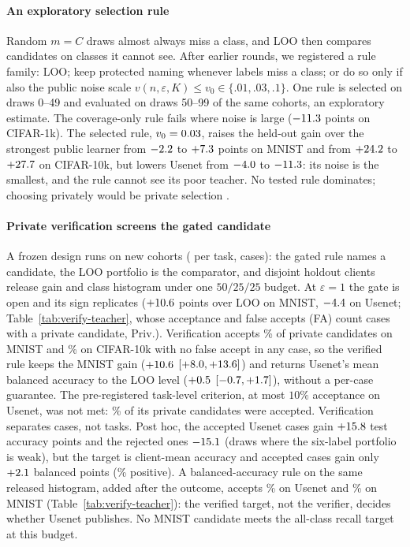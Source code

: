 \paragraph{An exploratory selection rule}
Random $m=C$ draws almost always miss a class, and LOO then compares
candidates on classes it cannot see. After earlier rounds, we registered a
rule family: LOO; keep protected naming whenever labels miss a class; or do
so only if also the public noise scale $v(n,\varepsilon,K)\le v_0\in
\{.01,.03,.1\}$. One rule is selected on draws 0--49 and evaluated on draws
50--99 of the same cohorts, an exploratory estimate. The coverage-only rule fails where noise
is large ($-11.3$ points on CIFAR-1k). The
selected rule, $v_0=0.03$, raises the held-out gain over the strongest
public learner from $-2.2$ to $+7.3$ points on MNIST and
from $+24.2$ to $+27.7$ on CIFAR-10k, but lowers
Usenet from $-4.0$ to $-11.3$: its noise is the smallest,
and the rule cannot see its poor teacher. No tested rule dominates; choosing privately would be private selection
\cite{liu2019private}.

\paragraph{Private verification screens the gated candidate}
A frozen design runs on new cohorts (\VTSeeds{} per task, \VTCases{}
cases): the gated rule names a candidate, the LOO portfolio is the
comparator, and disjoint holdout clients release gain and class histogram
under one $50/25/25$ budget. At $\varepsilon=1$ the gate is open and its
sign replicates ($+10.6$ points over LOO
on MNIST, $-4.4$ on Usenet; Table~\ref{tab:verify-teacher}, whose
acceptance and false accepts (FA) count cases with a private candidate, Priv.).
Verification accepts \VTMnistAccept{}\% of private candidates on MNIST and
\VTCifarAccept{}\% on CIFAR-10k with no false accept in any case, so the
verified rule keeps the MNIST gain ($+10.6$ $[+8.0,+13.6]$)
and returns Usenet's mean balanced accuracy to the LOO level
($+0.5$ $[-0.7,+1.7]$), without a per-case guarantee.
The pre-registered task-level criterion, at most $10\%$ acceptance on
Usenet, was not met: \VTUsenetAccept{}\% of its \VTUsenetPriv{} private
candidates were accepted. Verification separates cases, not tasks. Post hoc,
the \VTUsenetAccepted{} accepted Usenet cases gain $+15.8$ test
accuracy points and the rejected ones $-15.1$ (draws where the
six-label portfolio is weak), but the target is client-mean accuracy and
accepted cases gain only $+2.1$ balanced points
(\VTUsenetAccBalShare{}\% positive). A balanced-accuracy rule
on the same released histogram, added after the outcome, accepts
\BalUsenetAccept{}\% on Usenet and \BalMnistAccept{}\% on MNIST
(Table~\ref{tab:verify-teacher}): the verified target, not the verifier,
decides whether Usenet publishes. No MNIST candidate meets the all-class
recall target at this budget.

